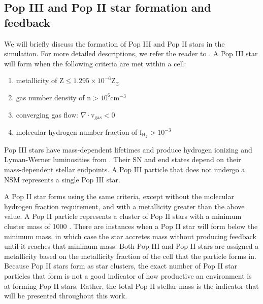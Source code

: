 \documentclass[fleqn,usenatbib]{mnras}
\begin{document}
\subsection{Pop III and Pop II star formation and feedback} \label{sec:star_formation}
We will briefly discuss the formation of Pop III and Pop II stars in the simulation. For more detailed descriptions, we refer the reader to \citet{Skinner20}. A Pop III star will form when the following criteria are met within a cell: 
\begin{enumerate}
	\item metallicity of $\mathrm{Z} \leq 1.295 \times 10^{-6} \mathrm{Z}_{\odot}$
	\item gas number density of $\mathrm{n} > 10^{6} \mathrm{cm}^{-3}$
	\item converging gas flow: $\nabla \cdot \mathrm{v}_{\mathrm{gas}} < 0$
	\item molecular hydrogen number fraction of $\mathrm{f}_{\mathrm{H}_{2}} > 10^{-3}$
\end{enumerate}
Pop III stars have mass-dependent lifetimes and produce hydrogen ionizing and Lyman-Werner luminosities from \citet{Schaerer02}. Their SN and end states depend on their mass-dependent stellar endpoints. A Pop III particle that does not undergo a NSM represents a single Pop III star. 

A Pop II star forms using the same criteria, except without the molecular hydrogen fraction requirement, and with a metallicity greater than the above value. A Pop II particle represents a cluster of Pop II stars with a minimum cluster mass of 1000 \Ms. There are instances when a Pop II star will form below the minimum mass, in which case the star accretes mass without producing feedback until it reaches that minimum mass. Both Pop III and Pop II stars are assigned a metallicity based on the metallicity fraction of the cell that the particle forms in. Because Pop II stars form as star clusters, the exact number of Pop II star particles that form is not a good indicator of how productive an environment is at forming Pop II stars. Rather, the total Pop II stellar mass is the indicator that will be presented throughout this work.


\end{document}
